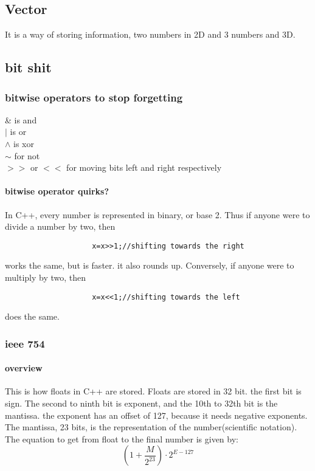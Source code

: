 \documentclass{article} %
\theoremstyle{theorem}
\theoremstyle{definition}
\begin{document}
    \subsection{Vector}\label{sub:csVec}
    It is a way of storing information, two numbers in 2D and 3 numbers and 3D.
    \subsection{bit shit}
        \subsubsection{bitwise operators to stop forgetting}
            \begin{center}
                \& is and\\$|$ is or\\$\wedge$ is xor\\$\sim$ for not\\$>>$ or $<<$ for moving bits left and right respectively
            \end{center}
            \paragraph{bitwise operator quirks?}
                In C++, every number is represented in binary, or base 2. Thus if anyone were to divide a number by two, then
                \begin{verbatim}
                    x=x>>1;//shifting towards the right
                \end{verbatim}
                works the same, but is faster. it also rounds up. Conversely, if anyone were to multiply by two, then 
                \begin{verbatim}
                    x=x<<1;//shifting towards the left
                \end{verbatim}
                does the same.
        \subsubsection{ieee 754}
            \paragraph{overview}
                This is how floats in C++ are stored. Floats are stored in 32 bit. the first bit is sign.
                The second to ninth bit is exponent, and the 10th to 32th bit is the mantissa. the exponent has
                an offset of 127, because it needs negative exponents. The mantissa, 23 bits, is the representation of the number(scientific notation).
                The equation to get from float to the final number is given by:
                \begin{equation}
                    (1+\dfrac{M}{2^{23}})\cdot2^{E-127}
                \end{equation}
\end{document}

